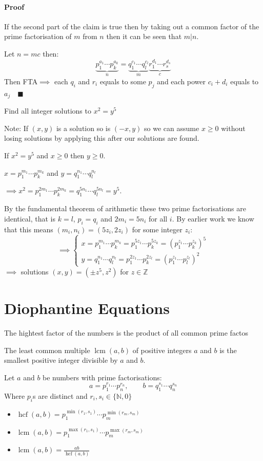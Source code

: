 \documentclass{article}
\newcommand{\bb}[1]{\mathbb{#1}}
\newcommand{\hcf}{\operatorname{hcf}}
\newcommand{\lcm}{\operatorname{lcm}}
\begin{document}
\paragraph{Proof} If the second part of the claim is true then by taking out a common factor of the prime factorisation of \(m\) from \(n\) then it can be seen that \(m|n\).

Let \(n=mc\) then:
\[\underbrace{p_1^{a_1}\dotsm p_k^{a_k}}_n=\underbrace{q_1^{c_1}\dotsm q_l^{c_l}}_m\underbrace{r_1^{d_1}\dotsm r_s^{d_s}}_c\]
Then FTA\(\implies\) each \(q_i\) and \(r_i\) equals to some \(p_j\) and each power \(c_i+d_i\) equals to \(a_j\quad\blacksquare\)

Find all integer solutions to \(x^2=y^5\)

Note: If \((x,y)\) is a solution so is \((-x,y)\) so we can assume \(x\ge0\) without losing solutions by applying this after our solutions are found.

If \(x^2=y^5\) and \(x\ge 0\) then \(y\ge0\).

\(x=p_1^{m_1}\dotsm p_k^{m_k}\) and \(y = q_1^{n_1}\dotsm q_l^{n_l}\)

\(\implies x^2 = p_1^{2m_1}\dotsm p_k^{2m_k} = q_1^{5n_1}\dotsm q_l^{5n_l} = y^5\).

By the fundamental theorem of arithmetic these two prime factorisations are identical, that is \(k=l\), \(p_i=q_i\) and \(2m_i=5n_i\) for all \(i\). By earlier work we know that this means \((m_i,n_i) = (5z_i,2z_i)\) for some integer \(z_i\):
\[\implies\left\{
\begin{array}{l}
x = p_1^{m_1}\dotsm p_k^{m_k} = p_1^{5z_1}\dotsm p_k^{5z_k} = (p_1^{z_1}\dotsm p_k^{z_k})^5\\
y =  q_1^{n_1}\dotsm q_l^{n_l} = p_1^{2z_1}\dotsm p_k^{2z_l} = (p_1^{z_1}\dotsm p_l^{z_l})^2
\end{array}
\right.\]
\(\implies\) solutions \((x,y)=(\pm z^5,z^2)\) for \(z\in\bb Z\)

\section{Diophantine Equations}

The hightest factor of the numbers is the product of all common prime factos

The least common multiple \(\lcm(a,b)\) of positive integers \(a\) and \(b\) is the smallest positive integer divisible by \(a\) and \(b\).

Let \(a\) and \(b\) be numbers with prime factorisations:
\[a = p_1^{r_1}\dotsm p_n^{r_n},\qquad b = q_1^{s_1}\dotsm q_n^{s_n}\]
Where \(p_i\)s are distinct and \(r_i,s_i\in\{\bb N, 0\}\)
\begin{itemize}
\item \(\displaystyle{\hcf(a,b) = p_1^{\min(r_1,s_1)}\dotsm p_m^{\min(r_m,s_m)}}\)
\item \(\displaystyle{\lcm(a,b) = p_1^{\max(r_1,s_1)}\dotsm p_m^{\max(r_m,s_m)}}\)
\item \(\displaystyle{\lcm(a,b) = \frac{ab}{\hcf(a,b)}}\)
\end{itemize}
\end{document}
